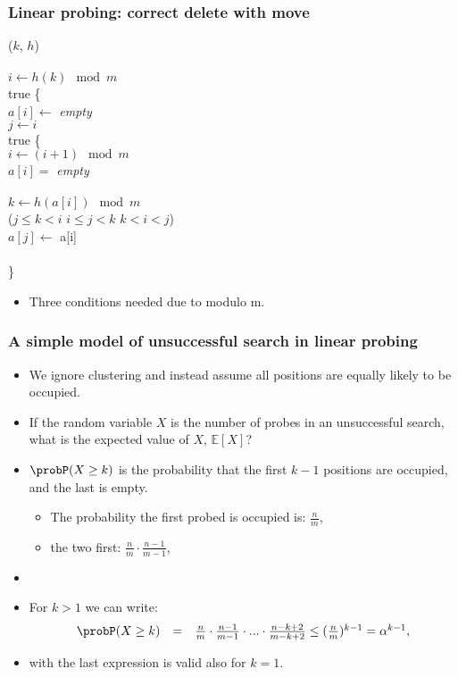 \documentclass[trans]{beamer}
\begin{document}
\begin{frame}[fragile=singleslide]
\frametitle{Linear probing: correct delete with move}
{\small
\begin{tabbing}
\ahdr
\PROC {}($k$, $h$)				\\
\BEGIN							\\
\>$i\leftarrow h(k) \mod m$ 				\\
\>\WHILE true \DO \{					\\
\>\>$a[i]\leftarrow$ {\em empty}				\\
\>\>$j\leftarrow i$ 					\\
\>\>\WHILE true \DO \{					\\
\>\>\>$i\leftarrow (i+1)\mod m$				\\
\>\>\>\IF $a[i] = $ {\em empty} \THEN				\\
\>\>\>\>\RETURN						\\
\>\>\>$k\leftarrow h(a[i]) \mod m$ 			\\
\>\>\>\IF \NOT ($j \le k < i$ \OR $i \le j < k$ \OR $k < i < j$) \THEN				\\
\>\>\>\>$a[j]\leftarrow$ a[i]				\\
\>\>\>\>\BREAK									\\
\>\}							\\
\END
\end{tabbing}
}
\begin{itemize}
\item Three conditions needed due to modulo m.
\end{itemize}
\end{frame}

\begin{frame}[fragile=singleslide]
\frametitle{A simple model of unsuccessful search in linear probing}
\begin{itemize}
\item We ignore clustering and instead assume all positions are equally likely to be occupied. 
\item If the random variable $X$ is the number of probes in an unsuccessful search, what is 
 the expected value of $X$, $\mathbb{E}[X]$?
\item $\probP(X \ge k)$ is the probability that the first $k-1$ positions are occupied, and the last is empty. 
\begin{itemize}
\item The probability the first probed is occupied is: $\frac{n}{m}$,
\item the two first: $\frac{n}{m} \cdot \frac{n-1}{m-1}$,
\end{itemize}
\item

\item For $k > 1$ we can write:
\[
\begin{array}{ccc}
\probP(X \ge k) &=& \frac{n}{m} \cdot \frac{n-1}{m-1} \cdot ... \cdot \frac{n-k+2}{m-k+2} \le (\frac{n}{m})^{k-1} = \alpha^{k-1},
\end{array}
\]
\item with the last expression is valid also for $k=1$.
\end{itemize}
\end{frame}
\end{document}
